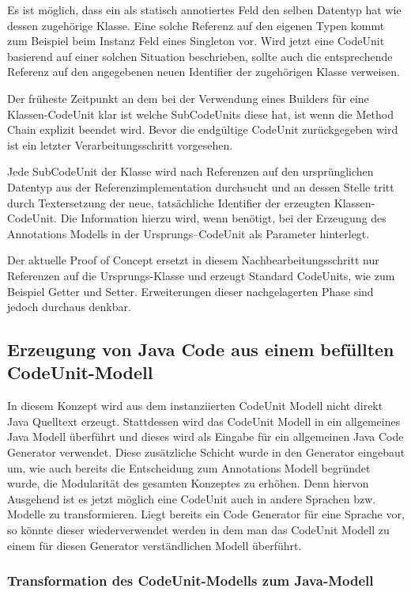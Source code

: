 \documentclass[12pt,oneside,a4paper,parskip]{scrbook}
\begin{document}
Es ist möglich, dass ein als statisch annotiertes Feld den selben Datentyp hat wie dessen zugehörige Klasse. Eine solche Referenz auf den eigenen Typen kommt zum Beispiel beim Instanz Feld eines Singleton vor. Wird jetzt eine CodeUnit basierend auf einer solchen Situation beschrieben, sollte auch die entsprechende Referenz auf den angegebenen neuen Identifier der zugehörigen Klasse verweisen.

Der früheste Zeitpunkt an dem bei der Verwendung eines Builders für eine Klassen-CodeUnit klar ist welche SubCodeUnits diese hat, ist wenn die Method Chain explizit beendet wird. Bevor die endgültige CodeUnit zurückgegeben wird ist ein letzter Verarbeitungsschritt vorgesehen. 

Jede SubCodeUnit der Klasse wird nach Referenzen auf den ursprünglichen Datentyp aus der Referenzimplementation durchsucht und an dessen Stelle tritt durch Textersetzung der neue, tatsächliche Identifier der erzeugten Klassen-CodeUnit. Die Information hierzu wird, wenn benötigt, bei der Erzeugung des Annotations Modells in der Ursprungs--CodeUnit als Parameter hinterlegt.

Der aktuelle Proof of Concept ersetzt in diesem Nachbearbeitungsschritt nur Referenzen auf die Ursprungs-Klasse und erzeugt Standard CodeUnits, wie zum Beispiel Getter und Setter. Erweiterungen dieser nachgelagerten Phase sind jedoch durchaus denkbar.

\subsection{Erzeugung von Java Code aus einem befüllten CodeUnit-Modell}

In diesem Konzept wird aus dem instanziierten CodeUnit Modell nicht direkt Java Quelltext erzeugt. Stattdessen wird das CodeUnit Modell in ein allgemeines Java Modell überführt und dieses wird als Eingabe für ein allgemeinen Java Code Generator verwendet. Diese zusätzliche Schicht wurde in den Generator eingebaut um, wie auch bereits die Entscheidung zum Annotations Modell begründet wurde, die Modularität des gesamten Konzeptes zu erhöhen. Denn hiervon Ausgehend ist es jetzt möglich eine CodeUnit auch in andere Sprachen  bzw. Modelle zu transformieren. Liegt bereits ein Code Generator für eine Sprache vor, so könnte dieser wiederverwendet werden in dem man das CodeUnit Modell zu einem für diesen Generator verständlichen Modell überführt.

\subsubsection{Transformation des CodeUnit-Modells zum Java-Modell}
\end{document}

